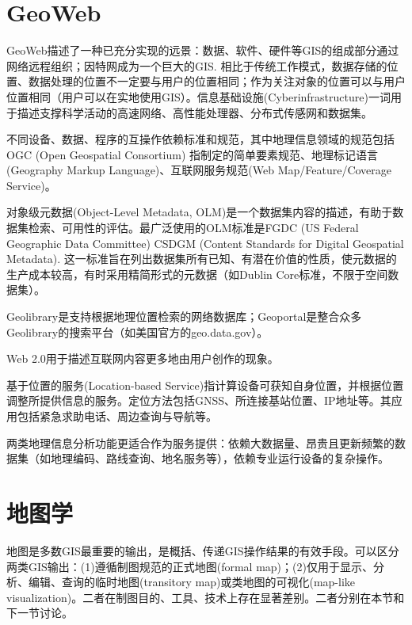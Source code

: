 \section{GeoWeb}

\par GeoWeb描述了一种已充分实现的远景：数据、软件、硬件等GIS的组成部分通过网络远程组织；因特网成为一个巨大的GIS. 相比于传统工作模式，数据存储的位置、数据处理的位置不一定要与用户的位置相同；作为关注对象的位置可以与用户位置相同（用户可以在实地使用GIS）。信息基础设施(Cyberinfrastructure)一词用于描述支撑科学活动的高速网络、高性能处理器、分布式传感网和数据集。

\par 不同设备、数据、程序的互操作依赖标准和规范，其中地理信息领域的规范包括OGC (Open Geospatial Consortium) 指制定的简单要素规范、地理标记语言(Geography Markup Language)、互联网服务规范(Web Map/Feature/Coverage Service)。

\par 对象级元数据(Object-Level Metadata, OLM)是一个数据集内容的描述，有助于数据集检索、可用性的评估。最广泛使用的OLM标准是FGDC (US Federal Geographic Data Committee) CSDGM (Content Standards for Digital Geospatial Metadata). 这一标准旨在列出数据集所有已知、有潜在价值的性质，使元数据的生产成本较高，有时采用精简形式的元数据（如Dublin Core标准，不限于空间数据集）。

\par Geolibrary是支持根据地理位置检索的网络数据库；Geoportal是整合众多Geolibrary的搜索平台（如美国官方的geo.data.gov）。

\par Web 2.0用于描述互联网内容更多地由用户创作的现象。

\par 基于位置的服务(Location-based Service)指计算设备可获知自身位置，并根据位置调整所提供信息的服务。定位方法包括GNSS、所连接基站位置、IP地址等。其应用包括紧急求助电话、周边查询与导航等。

\par 两类地理信息分析功能更适合作为服务提供：依赖大数据量、昂贵且更新频繁的数据集（如地理编码、路线查询、地名服务等），依赖专业运行设备的复杂操作。

\section{地图学}

\par 地图是多数GIS最重要的输出，是概括、传递GIS操作结果的有效手段。可以区分两类GIS输出：(1)遵循制图规范的正式地图(formal map)；(2)仅用于显示、分析、编辑、查询的临时地图(transitory map)或类地图的可视化(map-like visualization)。二者在制图目的、工具、技术上存在显著差别。二者分别在本节和下一节讨论。


